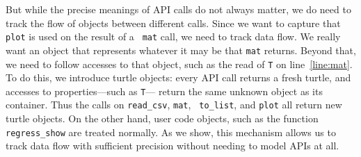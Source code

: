 But while the precise meanings of API calls do not always matter, we
do need to track the flow of objects between different calls.  Since
we want to capture that {\tt plot} is used on the result of a {\tt
  mat} call, we need to track data flow.  We really want an object
that represents whatever it may be that {\tt mat} returns.  Beyond
that, we need to follow accesses to that object, such as the read of
{\tt T} on line~\ref{line:mat}.  To do this, we introduce turtle
objects: every API call returns a fresh turtle, and accesses to
properties---such as {\tt T}--- return the same unknown object as its
container.  Thus the calls on {\tt read\_csv}, {\tt mat}, {\tt
  to\_list}, and {\tt  plot} all return new turtle objects.  On the
other hand, user code objects, such as the function {\tt
  regress\_show} are treated normally.  As we show, this mechanism
allows us to track data flow with sufficient precision without needing
to model APIs at all.
